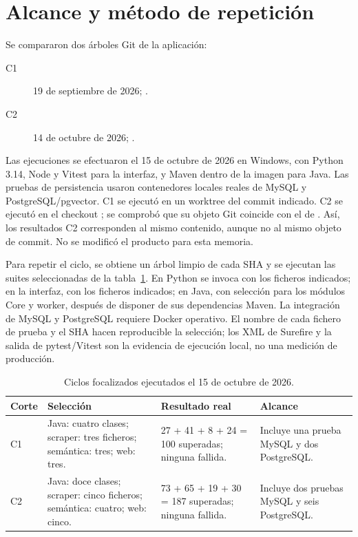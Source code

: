 \label{anexo:pruebas}

\section{Alcance y método de repetición}

Se compararon dos árboles Git de la aplicación:
\begin{description}
\item[C1] 19 de septiembre de 2026; .
\item[C2] 14 de octubre de 2026; .
\end{description}
Las ejecuciones se efectuaron el 15 de octubre de 2026 en Windows, con Python 3.14, Node y Vitest para la interfaz, y Maven dentro de la imagen  para Java. Las pruebas de persistencia usaron contenedores locales reales de MySQL y PostgreSQL/pgvector. C1 se ejecutó en un worktree del commit indicado. C2 se ejecutó en el checkout ; se comprobó que su objeto Git  coincide con el de . Así, los resultados C2 corresponden al mismo contenido, aunque no al mismo objeto de commit. No se modificó el producto para esta memoria.

Para repetir el ciclo, se obtiene un árbol limpio de cada SHA y se ejecutan las suites seleccionadas de la tabla~\ref{tabla:ciclos-prueba}. En Python se invoca  con los ficheros indicados; en la interfaz,  con los ficheros indicados; en Java,  con selección  para los módulos Core y worker, después de disponer de sus dependencias Maven. La integración de MySQL y PostgreSQL requiere Docker operativo. El nombre de cada fichero de prueba y el SHA hacen reproducible la selección; los XML de Surefire y la salida de pytest/Vitest son la evidencia de ejecución local, no una medición de producción.

\begin{table}[H]
\centering\small
\begin{tabularx}{\textwidth}{p{}p{}p{}X}
\toprule
\textbf{Corte} & \textbf{Selección} & \textbf{Resultado real} & \textbf{Alcance}\\
\midrule
C1 & Java: cuatro clases; scraper: tres ficheros; semántica: tres; web: tres. & 27 + 41 + 8 + 24 = 100 superadas; ninguna fallida. & Incluye una prueba MySQL y dos PostgreSQL.\\
C2 & Java: doce clases; scraper: cinco ficheros; semántica: cuatro; web: cinco. & 73 + 65 + 19 + 30 = 187 superadas; ninguna fallida. & Incluye dos pruebas MySQL y seis PostgreSQL.\\
\bottomrule
\end{tabularx}
\caption{Ciclos focalizados ejecutados el 15 de octubre de 2026.}
\label{tabla:ciclos-prueba}
\end{table}

